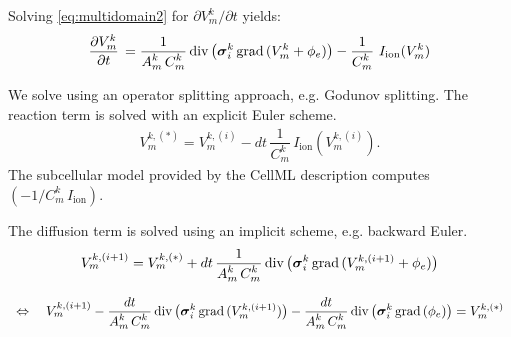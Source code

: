 Solving \eqref{eq:multidomain2} for $∂V_m^k/∂t$ yields:
\begin{equation*}
  \begin{array}{lll}
    \p{V_m^k}{t} = \dfrac{1}{A^k_m\,C_m^k}\div\big(\bfsigma_i^k\,\grad(V_m^k + \phi_e)\big) - \dfrac{1}{C_m^k}\,I_\text{ion}(V_m^k)\\[4mm]
  \end{array}
\end{equation*}
We solve using an operator splitting approach, e.g. Godunov splitting.
The reaction term is solved with an explicit Euler scheme.
\begin{equation*}
  \begin{array}{lll}
    V_m^{k,(*)} = V_m^{k,(i)} - dt\,\dfrac{1}{C_m^k}\,I_\text{ion}(V_m^{k,(i)}).
  \end{array}
\end{equation*}
The subcellular model provided by the CellML description computes $(-1/C_m^k\,I_\text{ion})$.

The diffusion term is solved using an implicit scheme, e.g. backward Euler.
\begin{equation}\label{eq:diffusion_term}
  \begin{array}{lll}
    V_m^{k,(i+1)} = V_m^{k,(*)} + dt\,\displaystyle\frac{\displaystyle{1}}{\displaystyle{A^k_m\,C_m^k}}\,\hbox{div} \,\big(\boldsymbol{\sigma}_i^k\,\hbox{grad} \,(V_m^{k,(i+1)} + \phi_e)\big)\\[4mm]
  \end{array}
\end{equation}
\begin{equation*}
  \begin{array}{lll}    \Leftrightarrow\quad 
    V_m^{k,(i+1)} -\displaystyle\frac{\displaystyle{dt}}{\displaystyle{A^k_m\,C_m^k}}\,\hbox{div} \,\big(\boldsymbol{\sigma}_i^k\,\hbox{grad} \,(V_m^{k,(i+1)})\big) - \displaystyle\frac{\displaystyle{dt}}{\displaystyle{A^k_m\,C_m^k}}\,\hbox{div} \,\big(\boldsymbol{\sigma}_i^k\,\hbox{grad} \,(\phi_e)\big) = V_m^{k,(*)}
  \end{array}
\end{equation*}

